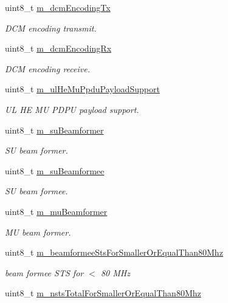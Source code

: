 \begin{DoxyCompactItemize}
uint8\+\_\+t \hyperlink{classns3_1_1HeCapabilities_a7f0d8ca47744f7f0b5ca6eeda52c66e9}{m\+\_\+dcm\+Encoding\+Tx}
\begin{DoxyCompactList}\small\item\em D\+CM encoding transmit. \end{DoxyCompactList}\item 
uint8\+\_\+t \hyperlink{classns3_1_1HeCapabilities_afe1da2309e85423e9d7b8ca27ca045c2}{m\+\_\+dcm\+Encoding\+Rx}
\begin{DoxyCompactList}\small\item\em D\+CM encoding receive. \end{DoxyCompactList}\item 
uint8\+\_\+t \hyperlink{classns3_1_1HeCapabilities_a71f3feb98d53dfeca95de2bf08e41443}{m\+\_\+ul\+He\+Mu\+Ppdu\+Payload\+Support}
\begin{DoxyCompactList}\small\item\em UL HE MU P\+D\+PU payload support. \end{DoxyCompactList}\item 
uint8\+\_\+t \hyperlink{classns3_1_1HeCapabilities_a8a4e2966d7d67a038a7b08f7d733819c}{m\+\_\+su\+Beamformer}
\begin{DoxyCompactList}\small\item\em SU beam former. \end{DoxyCompactList}\item 
uint8\+\_\+t \hyperlink{classns3_1_1HeCapabilities_a68f6c78532eaaec71445fa9d1bb86f1b}{m\+\_\+su\+Beamformee}
\begin{DoxyCompactList}\small\item\em SU beam formee. \end{DoxyCompactList}\item 
uint8\+\_\+t \hyperlink{classns3_1_1HeCapabilities_ab372f215235e3d509eeaf07301687a08}{m\+\_\+mu\+Beamformer}
\begin{DoxyCompactList}\small\item\em MU beam former. \end{DoxyCompactList}\item 
uint8\+\_\+t \hyperlink{classns3_1_1HeCapabilities_aa58d62ca4576da470b5d0b3eb31e4bd9}{m\+\_\+beamformee\+Sts\+For\+Smaller\+Or\+Equal\+Than80\+Mhz}
\begin{DoxyCompactList}\small\item\em beam formee S\+TS for $<$ 80 M\+Hz \end{DoxyCompactList}\item 
uint8\+\_\+t \hyperlink{classns3_1_1HeCapabilities_a005028af78a23140224a61769c938681}{m\+\_\+nsts\+Total\+For\+Smaller\+Or\+Equal\+Than80\+Mhz}

\end{DoxyCompactItemize}
